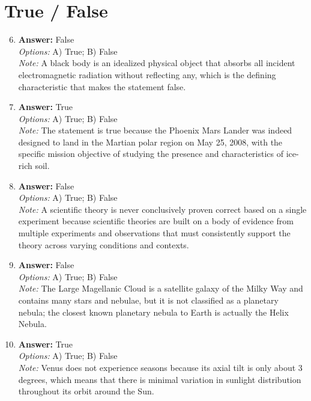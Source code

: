 \documentclass[12pt]{article}
\begin{document}
\section*{True / False}
\begin{enumerate}[label=\arabic*.]
\setcounter{enumi}{5}
\item \textbf{Answer:} False
\\ \textit{Options:} A) True; B) False
\\ \textit{Note:} A black body is an idealized physical object that absorbs all incident electromagnetic radiation without reflecting any, which is the defining characteristic that makes the statement false.
\item \textbf{Answer:} True
\\ \textit{Options:} A) True; B) False
\\ \textit{Note:} The statement is true because the Phoenix Mars Lander was indeed designed to land in the Martian polar region on May 25, 2008, with the specific mission objective of studying the presence and characteristics of ice-rich soil.
\item \textbf{Answer:} False
\\ \textit{Options:} A) True; B) False
\\ \textit{Note:} A scientific theory is never conclusively proven correct based on a single experiment because scientific theories are built on a body of evidence from multiple experiments and observations that must consistently support the theory across varying conditions and contexts.
\item \textbf{Answer:} False
\\ \textit{Options:} A) True; B) False
\\ \textit{Note:} The Large Magellanic Cloud is a satellite galaxy of the Milky Way and contains many stars and nebulae, but it is not classified as a planetary nebula; the closest known planetary nebula to Earth is actually the Helix Nebula.
\item \textbf{Answer:} True
\\ \textit{Options:} A) True; B) False
\\ \textit{Note:} Venus does not experience seasons because its axial tilt is only about 3 degrees, which means that there is minimal variation in sunlight distribution throughout its orbit around the Sun.
\end{enumerate}
\end{document}
